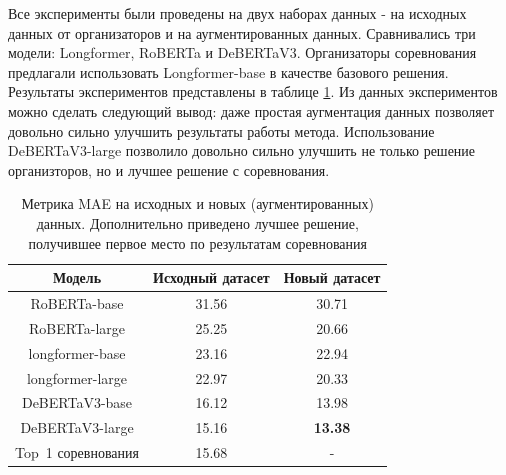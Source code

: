 Все эксперименты были проведены на двух наборах данных - на исходных данных от организаторов и на аугментированных данных. Сравнивались три модели: Longformer,  RoBERTa и DeBERTaV3. Организаторы соревнования предлагали использовать Longformer-base в качестве базового решения. Результаты экспериментов представлены в таблице \ref{tab:mae}. Из данных экспериментов можно сделать следующий вывод: даже простая аугментация данных позволяет довольно сильно улучшить результаты работы метода. Использование DeBERTaV3-large позволило довольно сильно улучшить не только решение организторов, но и лучшее решение с соревнования.
\begin{table}[ht!]
\centering
\begin{tabular}{|c |c | c |}
\hline
\textbf{Модель} & \textbf{Исходный датасет} & \textbf{Новый датасет} \\
\hline
RoBERTa-base &  31.56  & 30.71\\
RoBERTa-large & 25.25 &20.66\\
\hline
longformer-base  &  23.16 &22.94 \\
longformer-large  &  22.97 &20.33 \\
\hline
DeBERTaV3-base & 16.12 &13.98 \\
DeBERTaV3-large &  15.16 &\textbf{13.38} \\
\hline
Top~1 соревнования & 15.68 & - \\
\hline
\end{tabular}
\caption{Метрика MAE на исходных и новых (аугментированных) данных. Дополнительно приведено лучшее решение, получившее первое место по результатам соревнования} 
\label{tab:mae}
\end{table}